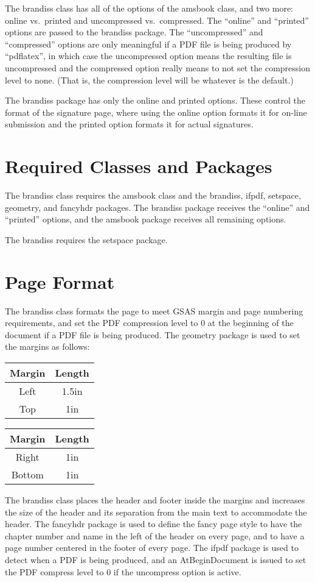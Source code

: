 \documentclass[12pt]{article}
\begin{document}
The brandiss class has all of the options of the amsbook class, and
two more: online vs.~printed and uncompressed vs.~compressed.  The
``online'' and ``printed'' options are passed to the brandiss package.
The ``uncompressed'' and ``compressed'' options are only meaningful if
a PDF file is being produced by ``pdflatex'', in which case the
uncompressed option means the resulting file is uncompressed and the
compressed option really means to not set the compression level to
none.  (That is, the compression level will be whatever is the
default.)

The brandiss package has only the online and printed options.  These
control the format of the signature page, where using the online
option formats it for on-line submission and the printed option
formats it for actual signatures.

\section{Required Classes and Packages}

The brandiss class requires the amsbook class and the brandiss, ifpdf,
setspace, geometry, and fancyhdr packages.  The brandiss package
receives the ``online'' and ``printed'' options, and the amsbook
package receives all remaining options.

The brandiss requires the setspace package.

\section{Page Format}

The brandiss class formats the page to meet GSAS margin and page
numbering requirements, and set the PDF compression level to 0 at the
beginning of the document if a PDF file is being produced.  The
geometry package is used to set the margins as follows:
\begin{center}
  \begin{tabular}{||c|c||}\hline\hline
    Margin & Length \\ \hline\hline
    Left & 1.5in \\ \hline
    Top & 1in \\ \hline\hline
  \end{tabular}
  \begin{tabular}{||c|c||}\hline\hline
    Margin & Length \\ \hline\hline
    Right & 1in \\ \hline
    Bottom & 1in \\ \hline\hline
  \end{tabular}
\end{center}
The brandiss class places the header and footer inside the margins and
increases the size of the header and its separation from the main text
to accommodate the header.  The fancyhdr package is used to define the
fancy page style to have the chapter number and name in the left of
the header on every page, and to have a page number centered in the
footer of every page.  The ifpdf package is used to detect when a PDF
is being produced, and an AtBeginDocument is issued to set the PDF
compress level to 0 if the uncompress option is active.
\end{document}
